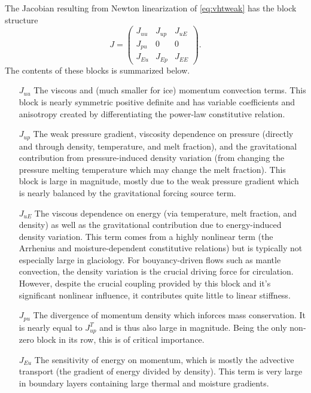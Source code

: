 The Jacobian resulting from Newton linearization of \eqref{eq:vhtweak} has the block structure
\begin{equation}\label{eq:vhtblock}
  J =
  \begin{pmatrix}
    J_{uu} & J_{up} & J_{uE} \\
    J_{pu} & 0 & 0 \\
    J_{Eu} & J_{Ep} & J_{EE}
  \end{pmatrix} .
\end{equation}
The contents of these blocks is summarized below.
\begin{itemize}
  \item[$J_{uu}$] The viscous and (much smaller for ice) momentum convection terms.
    This block is nearly symmetric positive definite and has variable coefficients and anisotropy created by differentiating the power-law constitutive relation.
  \item[$J_{up}$] The weak pressure gradient, viscosity dependence on pressure (directly and through density, temperature, and melt fraction), and the gravitational contribution from pressure-induced density variation (from changing the pressure melting temperature which may change the melt fraction).
    This block is large in magnitude, mostly due to the weak pressure gradient which is nearly balanced by the gravitational forcing source term.
  \item[$J_{uE}$] The viscous dependence on energy (via temperature, melt fraction, and density) as well as the gravitational contribution due to energy-induced density variation.
    This term comes from a highly nonlinear term (the Arrhenius and moisture-dependent constitutive relations) but is typically not especially large in glaciology.
    For bouyancy-driven flows such as mantle convection, the density variation is the crucial driving force for circulation.
    However, despite the crucial coupling provided by this block and it's significant nonlinear influence, it contributes quite little to linear stiffness.
  \item[$J_{pu}$] The divergence of momentum density which inforces mass conservation.
    It is nearly equal to $J_{up}^T$ and is thus also large in magnitude.
    Being the only non-zero block in its row, this is of critical importance.
  \item[$J_{Eu}$] The sensitivity of energy on momentum, which is mostly the advective transport (the gradient of energy divided by density).
    This term is very large in boundary layers containing large thermal and moisture gradients.

\end{itemize}
